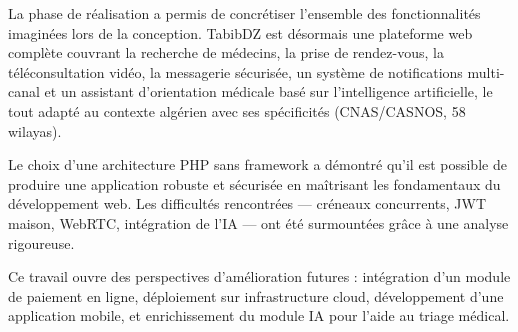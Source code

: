 \documentclass[12pt,a4paper]{report}
\begin{document}
\vspace{0.8cm}


La phase de r\'ealisation a permis de concr\'etiser l'ensemble des fonctionnalit\'es imagin\'ees lors de la conception. TabibDZ est d\'esormais une plateforme web compl\`ete couvrant la recherche de m\'edecins, la prise de rendez-vous, la t\'el\'econsultation vid\'eo, la messagerie s\'ecuris\'ee, un syst\`eme de notifications multi-canal et un assistant d'orientation m\'edicale bas\'e sur l'intelligence artificielle, le tout adapt\'e au contexte alg\'erien avec ses sp\'ecificit\'es (CNAS/CASNOS, 58 wilayas).

Le choix d'une architecture PHP sans framework a d\'emontr\'e qu'il est possible de produire une application robuste et s\'ecuris\'ee en ma\^itrisant les fondamentaux du d\'eveloppement web. Les difficult\'es rencontr\'ees --- cr\'eneaux concurrents, JWT maison, WebRTC, int\'egration de l'IA --- ont \'et\'e surmount\'ees gr\^ace \`a une analyse rigoureuse.

Ce travail ouvre des perspectives d'am\'elioration futures : int\'egration d'un module de paiement en ligne, d\'eploiement sur infrastructure cloud, d\'eveloppement d'une application mobile, et enrichissement du module IA pour l'aide au triage m\'edical.

\vspace*{\fill}
\end{document}
